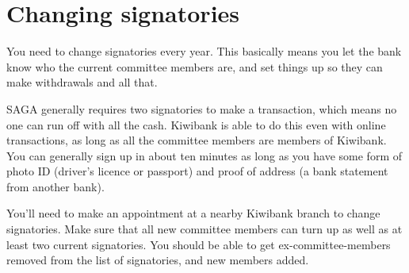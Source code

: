 \section{Changing signatories}

You need to change signatories every year. This basically means you let the bank know who the current committee members are, and set things up so they can make withdrawals and all that.

SAGA generally requires two signatories to make a transaction, which means no one can run off with all the cash. Kiwibank is able to do this even with online transactions, as long as all the committee members are members of Kiwibank. You can generally sign up in about ten minutes as long as you have some form of photo ID (driver's licence or passport) and proof of address (\eg a bank statement from another bank).

You'll need to make an appointment at a nearby Kiwibank branch to change signatories. Make sure that all new committee members can turn up as well as at least two current signatories. You should be able to get ex-committee-members removed from the list of signatories, and new members added.